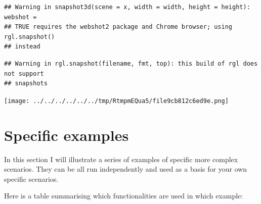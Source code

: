 \documentclass[
]{book}
\begin{document}
\begin{verbatim}
## Warning in snapshot3d(scene = x, width = width, height = height): webshot =
## TRUE requires the webshot2 package and Chrome browser; using rgl.snapshot()
## instead
\end{verbatim}

\begin{verbatim}
## Warning in rgl.snapshot(filename, fmt, top): this build of rgl does not support
## snapshots
\end{verbatim}

\texttt{[image: ../../../../../../tmp/RtmpmEQua5/file9cb812c6ed9e.png]}

\hypertarget{specific-examples}{%
\chapter{Specific examples}\label{specific-examples}}

In this section I will illustrate a series of examples of specific more complex scenarios.
They can be all run independently and used as a basis for your own specific scenarios.

Here is a table summarising which functionalities are used in which example:
\end{document}
